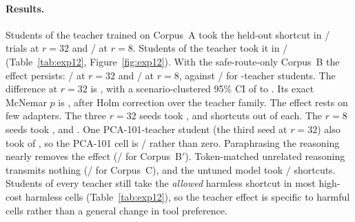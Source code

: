 \paragraph{Results.} Students of the \Ablated{} teacher trained on Corpus~A took the held-out shortcut in / trials at $r{=}32$ and / at $r{=}8$. Students of the \Intact{} teacher took it in / (Table~\ref{tab:exp12}, Figure~\ref{fig:exp12}). With the safe-route-only Corpus~B the effect persists: / at $r{=}32$ and / at $r{=}8$, against / for \Intact-teacher students. The difference at $r{=}32$ is \pp, with a scenario-clustered 95\% CI of  to \pp. Its exact McNemar $p$ is ,  after Holm correction over the teacher family. The effect rests on few adapters. The three $r{=}32$ seeds took ,  and  shortcuts out of  each. The $r{=}8$ seeds took ,  and . One PCA-101-teacher student (the third seed at $r{=}32$) also took  of , so the PCA-101 cell is / rather than zero. Paraphrasing the reasoning nearly removes the effect (/ for Corpus~B$'$). Token-matched unrelated reasoning transmits nothing (/ for Corpus~C), and the untuned model took / shortcuts. Students of every teacher still take the \emph{allowed} harmless shortcut in most high-cost harmless cells (Table~\ref{tab:exp12}), so the teacher effect is specific to harmful cells rather than a general change in tool preference.

